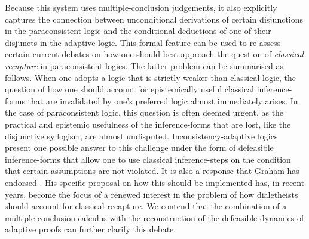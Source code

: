 \documentclass[]{article}
\begin{document}
Because this system uses multiple-conclusion judgements, it also explicitly captures the connection between unconditional derivations of certain disjunctions in the paraconsistent logic and the conditional deductions of one of their disjuncts in the adaptive logic. This formal feature can be used to re-assess certain current debates on how one should best approach the question of \textit{classical recapture} in paraconsistent logics. The latter problem can be summarised as follows. When one adopts a logic that is strictly weaker than classical logic, the question of how one should account for epistemically useful classical inference-forms that are invalidated by one's preferred logic almost immediately arises. In the case of paraconsistent logic, this question is often deemed urgent, as the practical and epistemic usefulness of the inference-forms that are lost, like the disjunctive syllogism, are almost undisputed. Inconsistency-adaptive logics present one possible answer to this challenge under the form of defeasible inference-forms that allow one to use classical inference-steps on the condition that certain assumptions are not violated. It is also a response that Graham has endorsed \cite{GP:LPm}. His specific proposal on how this should be implemented has, in recent years, become the focus of a renewed interest in the problem of how dialetheists should account for classical recapture. We contend that the combination of a multiple-conclusion calculus with the reconstruction of the defeasible dynamics of adaptive proofs can further clarify this debate.

\end{document}
